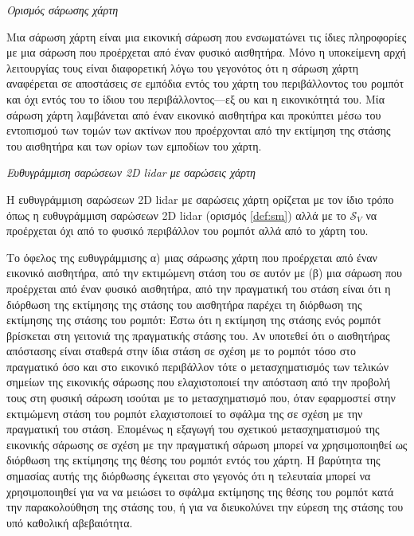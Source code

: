 \begin{bw_box}
\begin{definition}
\label{def:map_scan}
\textit{Ορισμός σάρωσης χάρτη}

Μια σάρωση χάρτη είναι μια εικονική σάρωση που ενσωματώνει τις ίδιες
πληροφορίες με μια σάρωση που προέρχεται από έναν φυσικό αισθητήρα. Μόνο η
υποκείμενη αρχή λειτουργίας τους είναι διαφορετική λόγω του γεγονότος ότι η
σάρωση χάρτη αναφέρεται σε αποστάσεις σε εμπόδια εντός του χάρτη του
περιβάλλοντος του ρομπότ και όχι εντός του το ίδιου του περιβάλλοντος---εξ ου
και η εικονικότητά του. Μία σάρωση χάρτη λαμβάνεται από έναν εικονικό
αισθητήρα και προκύπτει μέσω του εντοπισμού των τομών των ακτίνων που
προέρχονται από την εκτίμηση της στάσης του αισθητήρα και των ορίων των
εμποδίων του χάρτη.
\end{definition}
\end{bw_box}

\begin{bw_box}
\begin{definition}
\label{def:smsm}
\textit{Ευθυγράμμιση σαρώσεων 2D lidar με σαρώσεις χάρτη}

Η ευθυγράμμιση σαρώσεων 2D lidar με σαρώσεις χάρτη ορίζεται με τον ίδιο τρόπο
όπως η ευθυγράμμιση σαρώσεων 2D lidar (ορισμός \ref{def:sm}) αλλά με το
$\mathcal{S}_V$ να προέρχεται όχι από το φυσικό περιβάλλον του ρομπότ αλλά
από το χάρτη του.
\end{definition}
\end{bw_box}


\begin{gg_box}
\begin{remark}
\label{remark:smsm_benefit}
Το όφελος της ευθυγράμμισης α) μιας σάρωσης χάρτη που προέρχεται από έναν
εικονικό αισθητήρα, από την εκτιμώμενη στάση του σε αυτόν με (β) μια σάρωση
που προέρχεται από έναν φυσικό αισθητήρα, από την πραγματική του στάση είναι
ότι η διόρθωση της εκτίμησης της στάσης του αισθητήρα παρέχει τη διόρθωση της
εκτίμησης της στάσης του ρομπότ: Έστω ότι η εκτίμηση της στάσης ενός ρομπότ
βρίσκεται στη γειτονιά της πραγματικής στάσης του. Αν υποτεθεί ότι ο
αισθητήρας απόστασης είναι σταθερά στην ίδια στάση σε σχέση με το ρομπότ τόσο
στο πραγματικό όσο και στο εικονικό περιβάλλον τότε ο μετασχηματισμός των
τελικών σημείων της εικονικής σάρωσης που ελαχιστοποιεί την απόσταση από την
προβολή τους στη φυσική σάρωση ισούται με το μετασχηματισμό που, όταν
εφαρμοστεί στην εκτιμώμενη στάση του ρομπότ ελαχιστοποιεί το σφάλμα της σε
σχέση με την πραγματική του στάση. Επομένως η εξαγωγή του σχετικού
μετασχηματισμού της εικονικής σάρωσης σε σχέση με την πραγματική σάρωση
μπορεί να χρησιμοποιηθεί ως διόρθωση της εκτίμησης της θέσης του ρομπότ εντός
του χάρτη. Η βαρύτητα της σημασίας αυτής της διόρθωσης έγκειται στο γεγονός
ότι η τελευταία μπορεί να χρησιμοποιηθεί για να να μειώσει το σφάλμα
εκτίμησης της θέσης του ρομπότ κατά την παρακολούθηση της στάσης του, ή για
να διευκολύνει την εύρεση της στάσης του υπό καθολική αβεβαιότητα.
\end{remark}
\end{gg_box}


